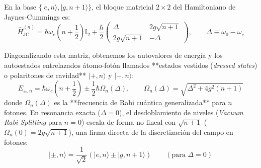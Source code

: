 \documentclass[11pt,a4paper]{book}
\begin{document}
En la base $\{|e, n\rangle, |g, n+1\rangle\}$, el bloque matricial $2\times 2$ del Hamiltoniano de Jaynes-Cummings es:
\begin{equation}
\hat{H}_{\text{JC}}^{(n)} = \hbar\omega_c\left(n + \frac{1}{2}\right)\mathbb{I}_2 + \frac{\hbar}{2} \begin{pmatrix} \Delta & 2g\sqrt{n+1} \\ 2g\sqrt{n+1} & -\Delta \end{pmatrix}, \qquad \Delta \equiv \omega_0 - \omega_c
\end{equation}

Diagonalizando esta matriz, obtenemos los autovalores de energía y los autoestados entrelazados átomo-fotón llamados **estados vestidos (\textit{dressed states}) o polaritones de cavidad** $|+, n\rangle$ y $|-, n\rangle$:
\begin{equation}
E_{\pm, n} = \hbar\omega_c\left(n + \frac{1}{2}\right) \pm \frac{1}{2}\hbar\Omega_n(\Delta), \qquad \Omega_n(\Delta) = \sqrt{\Delta^2 + 4g^2(n+1)}
\end{equation}
donde $\Omega_n(\Delta)$ es la **frecuencia de Rabi cuántica generalizada** para $n$ fotones. En resonancia exacta ($\Delta = 0$), el desdoblamiento de niveles (\textit{Vacuum Rabi Splitting} para $n=0$) escala de forma no lineal con $\sqrt{n+1}$ ($\Omega_n(0) = 2g\sqrt{n+1}$), una firma directa de la discretización del campo en fotones:
\begin{equation}
|\pm, n\rangle = \frac{1}{\sqrt{2}} \left( |e, n\rangle \pm |g, n+1\rangle \right) \qquad (\text{para } \Delta = 0)
\end{equation}
\end{document}
